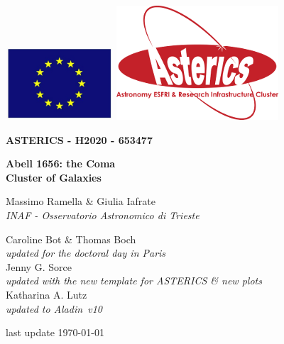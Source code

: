 \documentclass [a4paper, 12pt]{article}
\newcommand{\aladin}{{\textsc{A}{ladin}}}
\begin{document}
\begin{center}\includegraphics[width=0.3\textwidth]{../images/logo_euro.png} 
\hspace{5cm}\includegraphics[width=0.4 
\textwidth]{../images/logo_asterics.png}\\
\vspace{1.5cm}
\begin{Huge} \textbf{ASTERICS - H2020 - 653477} \end{Huge} \end{center}

 
 \vspace{1cm}
\Huge
\begin{center}
\bf Abell 1656: the Coma\\ Cluster of Galaxies
  \end{center}

 
\vspace{1cm}
\large
\begin{center}
Massimo Ramella \& Giulia Iafrate\\ %
\textit{INAF - Osservatorio Astronomico di Trieste}
\end{center}
\vspace{0.5cm}
\begin{center}
Caroline Bot \& Thomas Boch\\
\textit{updated for the doctoral day in Paris}\\
\vspace{0.5cm}
Jenny G. Sorce\\
\textit{updated with the new template for ASTERICS \& new plots}\\
\vspace{0.5cm}
Katharina A. Lutz\\
\textit{updated to \aladin\ v10}
\end{center}
\vspace{0.5cm}
\begin{center}
last update \today
\end{center}
\end{document}
